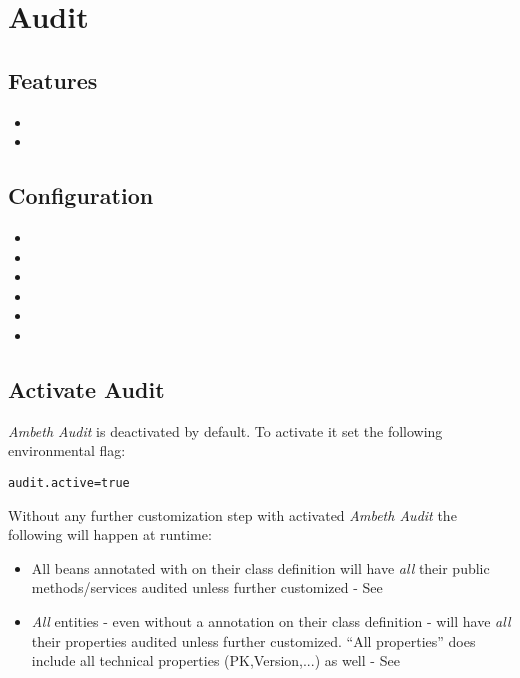 \section{Audit}
\label{module:Audit}
\ClearAPI
\TODO
\subsection{Features}
\begin{itemize}
	\item {}
	\item {}
\end{itemize}

\subsection{Configuration}
\begin{itemize}
	\item {}
	\item {}
	\item {}
	\item {}
	\item {}
	\item {}
\end{itemize}

\subsection{Activate Audit}
\textit{Ambeth Audit} is deactivated by default. To activate it set the following environmental flag:
\begin{lstlisting}[style=Props]
audit.active=true
\end{lstlisting}

Without any further customization step with activated \textit{Ambeth Audit} the following will happen at runtime:
\begin{itemize}
	\item All beans annotated with \type{\@Audited} on their class definition will have \emph{all} their public methods/services audited unless further customized - See 
	\item \emph{All} entities - even without a  annotation on their class definition - will have \emph{all} their properties audited unless further customized. ``All properties'' does include all technical properties (PK,Version,...) as well - See 
\end{itemize}

